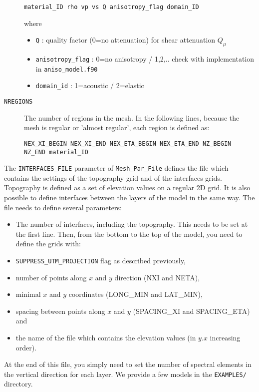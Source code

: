 \begin{description}
\begin{verbatim}
material_ID rho vp vs Q anisotropy_flag domain_ID
\end{verbatim}

\noindent
where
\begin{itemize}
\item \texttt{Q} : quality factor (0=no attenuation) for shear attenuation $Q_{\mu}$
\item \texttt{anisotropy\_flag} : 0=no anisotropy / 1,2,.. check with implementation
in \texttt{aniso\_model.f90}
\item \texttt{domain\_id} : 1=acoustic / 2=elastic
\end{itemize}
\item [{\texttt{NREGIONS}}] The number of regions in the mesh. In the following
lines, because the mesh is regular or 'almost regular', each region
is defined as:
\begin{verbatim}
NEX_XI_BEGIN NEX_XI_END NEX_ETA_BEGIN NEX_ETA_END NZ_BEGIN NZ_END material_ID
\end{verbatim}
\end{description}
%
The \texttt{INTERFACES\_FILE} parameter of \texttt{Mesh\_Par\_File}
defines the file which contains the settings of the topography grid
and of the interfaces grids. Topography is defined as a set of elevation
values on a regular 2D grid. It is also possible to define interfaces
between the layers of the model in the same way. The file needs to
define several parameters:
\begin{itemize}
\item The number of interfaces, including the topography. This needs to
be set at the first line. Then, from the bottom to the top of the
model, you need to define the grids with:
\item \texttt{SUPPRESS\_UTM\_PROJECTION} flag as described previously,
\item number of points along $x$ and $y$ direction (NXI and NETA),
\item minimal $x$ and $y$ coordinates (LONG\_MIN and LAT\_MIN),
\item spacing between points along $x$ and $y$ (SPACING\_XI and SPACING\_ETA)
and
\item the name of the file which contains the elevation values (in $y$.$x$
increasing order).
\end{itemize}
%
At the end of this file, you simply need to set the number of spectral
elements in the vertical direction for each layer. We provide a few
models in the {\texttt{EXAMPLES/}} directory.\\

